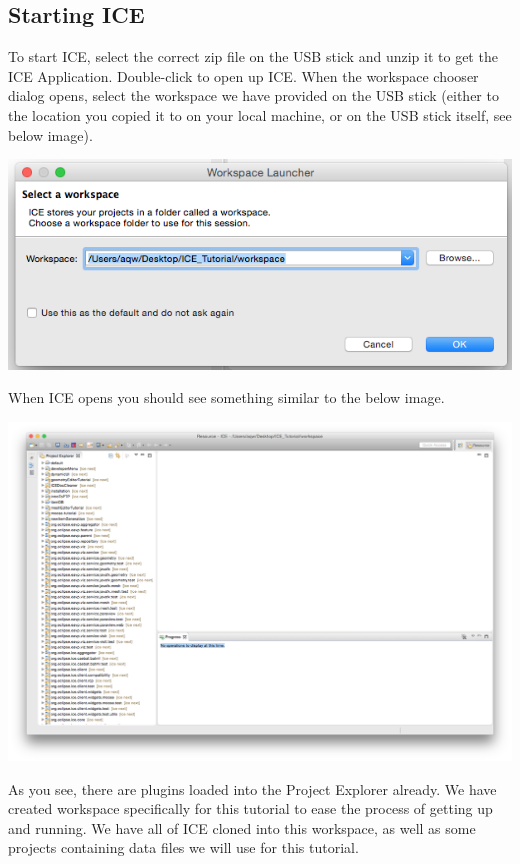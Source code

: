 \documentclass{article}
\begin{document}
\subsection*{Starting ICE}
To start ICE, select the correct zip file on the USB stick and unzip it to get
the ICE Application. Double-click to open up ICE. When the workspace chooser
dialog opens, select the workspace we have provided on the USB stick (either to
the location you copied it to on your local machine, or on the USB stick
itself, see below image). 
\begin{center} \includegraphics[width=\textwidth]{figures/workspace}
\end{center}
When ICE opens you should see something similar to the below image. 
\begin{center} \includegraphics[width=\textwidth]{figures/expectedICE}
\end{center} 

As you see, there are plugins loaded into the Project Explorer already. We have
created workspace specifically for this tutorial to ease the process of getting
up and running. We have all of ICE cloned into this workspace, as well as some
projects containing data files we will use for this tutorial. 
\end{document}
